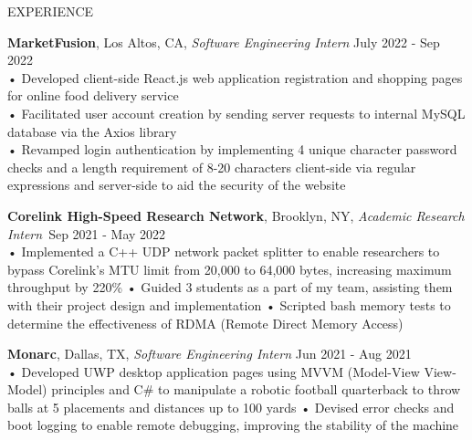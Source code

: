 \documentclass{resume} %
\begin{document}
\begin{rSection}{EXPERIENCE}

\textbf{MarketFusion}, Los Altos, CA, {\emph{Software Engineering Intern}} \hfill July 2022 - Sep 2022 \\
• Developed client-side React.js web application registration and shopping pages for online food delivery service \\
• Facilitated user account creation by sending server requests to internal MySQL database via the Axios library \\
• Revamped login authentication by implementing 4 unique character password checks and a length requirement of 8-20 characters client-side via regular expressions and server-side to aid the security of the website 

\textbf{Corelink High-Speed Research Network}, Brooklyn, NY, {\emph{Academic Research Intern}}\ \hfill Sep 2021 - May 2022 \\
• Implemented a C++ UDP network packet splitter to enable researchers to bypass Corelink's MTU limit from 20,000 to 64,000 bytes, increasing maximum throughput by 220\% \newline
• Guided 3 students as a part of my team, assisting them with their project design and implementation \newline
• Scripted bash memory tests to determine the effectiveness of RDMA (Remote Direct Memory Access) 

\textbf{Monarc}, Dallas, TX, {\emph{Software Engineering Intern}} \hfill Jun 2021 - Aug 2021 \\
• Developed UWP desktop application pages using MVVM (Model-View View-Model) principles and C\# to manipulate a robotic football quarterback to throw balls at 5 placements and distances up to 100 yards\newline
• Devised error checks and boot logging to enable remote debugging, improving the stability of the machine \smallskip
\end{rSection} 
\end{document}
